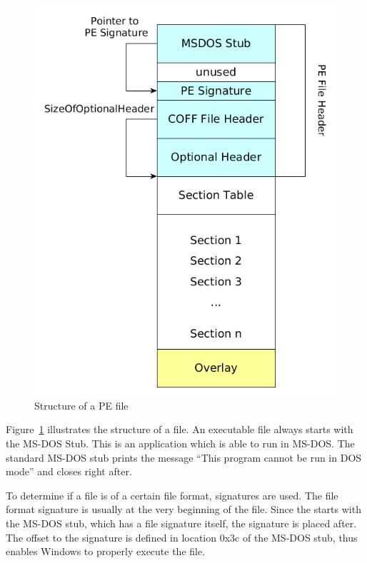 \begin{figure}
\includegraphics[width=.98\textwidth, height=\textheight,keepaspectratio]{graphics/peformat}
\caption{Structure of a PE file}
\label{fig:peformat} 
\end{figure}

Figure~\ref{fig:peformat} illustrates the structure of a \PE{} file. An executable \PE{} file always starts with the MS-DOS Stub. This is an application which is able to run in MS-DOS. The standard MS-DOS stub prints the message \enquote{This program cannot be run in DOS mode} and closes right after. 

To determine if a file is of a certain file format, signatures are used. The file format signature is usually at the very beginning of the file. Since the \PE{} starts with the MS-DOS stub, which has a file signature itself, the \PE{} signature is placed after.  The offset to the \PE{} signature is defined in location 0x3c of the MS-DOS stub, thus enables Windows to properly execute the \PE{} file. 

